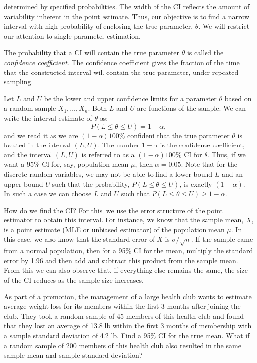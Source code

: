 determined by specified probabilities. The width of the CI reflects the amount of variability inherent in the point estimate. Thus, our objective is to find a narrow interval with high probability of enclosing the true parameter, $\theta$. We will restrict our attention to single-parameter estimation.

The probability that a CI will contain the true parameter $\theta$ is called the \textit{confidence coefficient}. The confidence coefficient gives the fraction of the time that the constructed interval will contain the true parameter, under repeated sampling.

Let $L$ and $U$ be the lower and upper confidence limits for a parameter $\theta$ based on a random sample $X_1, \ldots, X_n$. Both $L$ and $U$ are functions of the sample. We can write the interval estimate of $\theta$ as:
\[
P(L \leq \theta \leq U) = 1 - \alpha,
\]
and we read it as we are $(1 - \alpha)100\%$ confident that the true parameter $\theta$ is located in the interval $(L, U)$. The number $1 - \alpha$ is the confidence coefficient, and the interval $(L, U)$ is referred to as a $(1 - \alpha)100\%$ CI for $\theta$. Thus, if we want a 95\% CI for, say, population mean $\mu$, then $\alpha = 0.05$. Note that for the discrete random variables, we may not be able to find a lower bound $L$ and an upper bound $U$ such that the probability, $P(L \leq \theta \leq U)$, is exactly $(1 - \alpha)$. In such a case we can choose $L$ and $U$ such that $P(L \leq \theta \leq U) \geq 1 - \alpha$.

How do we find the CI? For this, we use the error structure of the point estimator to obtain this interval. For instance, we know that the sample mean, $\bar{X}$, is a point estimate (MLE or unbiased estimator) of the population mean $\mu$. In this case, we also know that the standard error of $\bar{X}$ is $\sigma/\sqrt{n}$. If the sample came from a normal population, then for a 95\% CI for the mean, multiply the standard error by 1.96 and then add and subtract this product from the sample mean. From this we can also observe that, if everything else remains the same, the size of the CI reduces as the sample size increases.

\begin{example}[5.4.1]
As part of a promotion, the management of a large health club wants to estimate average weight loss for its members within the first 3 months after joining the club. They took a random sample of 45 members of this health club and found that they lost an average of 13.8 lb within the first 3 months of membership with a sample standard deviation of 4.2 lb. Find a 95\% CI for the true mean. What if a random sample of 200 members of this health club also resulted in the same sample mean and sample standard deviation?
\end{example}

